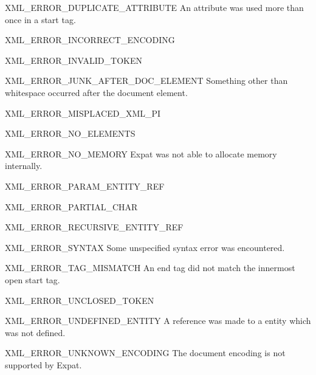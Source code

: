 \begin{datadesc}{XML_ERROR_DUPLICATE_ATTRIBUTE}
An attribute was used more than once in a start tag.
\end{datadesc}

\begin{datadesc}{XML_ERROR_INCORRECT_ENCODING}
\end{datadesc}

\begin{datadesc}{XML_ERROR_INVALID_TOKEN}
\end{datadesc}

\begin{datadesc}{XML_ERROR_JUNK_AFTER_DOC_ELEMENT}
Something other than whitespace occurred after the document element.
\end{datadesc}

\begin{datadesc}{XML_ERROR_MISPLACED_XML_PI}
\end{datadesc}

\begin{datadesc}{XML_ERROR_NO_ELEMENTS}
\end{datadesc}

\begin{datadesc}{XML_ERROR_NO_MEMORY}
Expat was not able to allocate memory internally.
\end{datadesc}

\begin{datadesc}{XML_ERROR_PARAM_ENTITY_REF}
\end{datadesc}

\begin{datadesc}{XML_ERROR_PARTIAL_CHAR}
\end{datadesc}

\begin{datadesc}{XML_ERROR_RECURSIVE_ENTITY_REF}
\end{datadesc}

\begin{datadesc}{XML_ERROR_SYNTAX}
Some unspecified syntax error was encountered.
\end{datadesc}

\begin{datadesc}{XML_ERROR_TAG_MISMATCH}
An end tag did not match the innermost open start tag.
\end{datadesc}

\begin{datadesc}{XML_ERROR_UNCLOSED_TOKEN}
\end{datadesc}

\begin{datadesc}{XML_ERROR_UNDEFINED_ENTITY}
A reference was made to a entity which was not defined.
\end{datadesc}

\begin{datadesc}{XML_ERROR_UNKNOWN_ENCODING}
The document encoding is not supported by Expat.
\end{datadesc}
